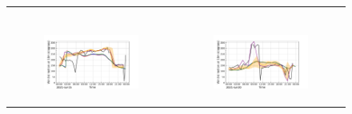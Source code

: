 \begin{figure}[hbtp]
\begin{tabular}{cc}
\begin{subfigure}[t]{0.5\textwidth}
        \end{subfigure} \\
        \begin{subfigure}[t]{0.5\textwidth}
            \caption{}
            \includegraphics[width=\textwidth]{images/chap5/IOP_TS/TS_2021-07-15_elsplans_wind_direction_10m.png}
        \end{subfigure} &
        \begin{subfigure}[t]{0.5\textwidth}
            \caption{}
            \includegraphics[width=\textwidth]{images/chap5/IOP_TS/TS_2021-07-20_elsplans_wind_direction_10m.png}
        \end{subfigure} \\
    \end{tabular}
    \caption{}
    \label{fig:iop_days_TS_surfvars_elsplans}
\end{figure}

